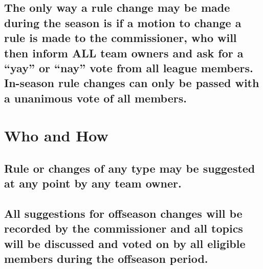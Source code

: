 \documentclass[
]{book}
\begin{document}
\hypertarget{the-only-way-a-rule-change-may-be-made-during-the-season-is-if-a-motion-to-change-a-rule-is-made-to-the-commissioner-who-will-then-inform-all-team-owners-and-ask-for-a-yay-or-nay-vote-from-all-league-members.-in-season-rule-changes-can-only-be-passed-with-a-unanimous-vote-of-all-members.}{%
\subsection{The only way a rule change may be made during the season is if a motion to change a rule is made to the commissioner, who will then inform ALL team owners and ask for a ``yay'' or ``nay'' vote from all league members. In-season rule changes can only be passed with a unanimous vote of all members.}\label{the-only-way-a-rule-change-may-be-made-during-the-season-is-if-a-motion-to-change-a-rule-is-made-to-the-commissioner-who-will-then-inform-all-team-owners-and-ask-for-a-yay-or-nay-vote-from-all-league-members.-in-season-rule-changes-can-only-be-passed-with-a-unanimous-vote-of-all-members.}}

\hypertarget{who-and-how}{%
\section{Who and How}\label{who-and-how}}

\hypertarget{rule-or-changes-of-any-type-may-be-suggested-at-any-point-by-any-team-owner.}{%
\subsection{Rule or changes of any type may be suggested at any point by any team owner.}\label{rule-or-changes-of-any-type-may-be-suggested-at-any-point-by-any-team-owner.}}

\hypertarget{all-suggestions-for-offseason-changes-will-be-recorded-by-the-commissioner-and-all-topics-will-be-discussed-and-voted-on-by-all-eligible-members-during-the-offseason-period.}{%
\subsection{All suggestions for offseason changes will be recorded by the commissioner and all topics will be discussed and voted on by all eligible members during the offseason period.}\label{all-suggestions-for-offseason-changes-will-be-recorded-by-the-commissioner-and-all-topics-will-be-discussed-and-voted-on-by-all-eligible-members-during-the-offseason-period.}}
\end{document}

